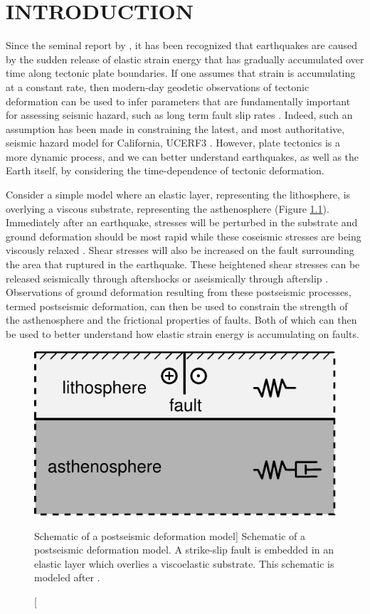 \chapter{INTRODUCTION}
Since the seminal report by \citet{Reid1910}, it has been recognized that earthquakes are caused by the sudden release of elastic strain energy that has gradually accumulated over time along tectonic plate boundaries. If one assumes that strain is accumulating at a constant rate, then modern-day geodetic observations of tectonic deformation can be used to infer parameters that are fundamentally important for assessing seismic hazard, such as long term fault slip rates \citep[e.g.,][]{Savage1973,Meade2005}. Indeed, such an assumption has been made in constraining the latest, and most authoritative, seismic hazard model for California, UCERF3 \citep{Field2014}. However, plate tectonics is a more dynamic process, and we can better understand earthquakes, as well as the Earth itself, by considering the time-dependence of tectonic deformation. 

Consider a simple model where an elastic layer, representing the lithosphere, is overlying a viscous substrate, representing the asthenosphere (Figure \ref{intro:fig:1}). Immediately after an earthquake, stresses will be perturbed in the substrate and ground deformation should be most rapid while these coseismic stresses are being viscously relaxed \citep{Nur1974,Savage1978}. Shear stresses will also be increased on the fault surrounding the area that ruptured in the earthquake. These heightened shear stresses can be released seismically through aftershocks or aseismically through afterslip \citep{Marone1991}. Observations of ground deformation resulting from these postseismic processes, termed postseismic deformation, can then be used to constrain the strength of the asthenosphere and the frictional properties of faults. Both of which can then be used to better understand how elastic strain energy is accumulating on faults. 

\begin{figure}
\includegraphics{schematic}
\caption
[Schematic of a postseismic deformation model]
{Schematic of a postseismic deformation model. A strike-slip fault is embedded in an elastic layer which overlies a viscoelastic substrate. This schematic is modeled after \citep{Savage1978}.}
\label{intro:fig:1}
\end{figure}

